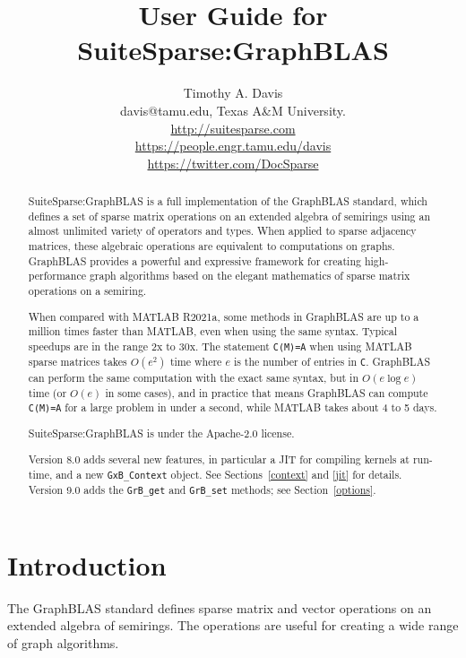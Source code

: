 \documentclass[12pt]{article}
\title{User Guide for SuiteSparse:GraphBLAS}
\author{Timothy A. Davis \\
\small
davis@tamu.edu, Texas A\&M University. \\
\small
\url{http://suitesparse.com} \\
\small
\url{https://people.engr.tamu.edu/davis} \\
\small
\url{https://twitter.com/DocSparse}
}
\begin{document}
\maketitle

\begin{abstract}
SuiteSparse:GraphBLAS is a full implementation of the GraphBLAS standard,
which defines a set of sparse matrix operations on an extended algebra of
semirings using an almost unlimited variety of operators and types.  When
applied to sparse adjacency matrices, these algebraic operations are equivalent
to computations on graphs.  GraphBLAS provides a powerful and expressive
framework for creating high-performance graph algorithms based on the elegant
mathematics of sparse matrix operations on a semiring.

When compared with MATLAB R2021a, some methods in GraphBLAS are up to
a million times faster than MATLAB, even when using the same syntax.
Typical speedups are in the range 2x to 30x.
The statement \verb'C(M)=A' when using MATLAB sparse matrices takes
$O(e^2)$ time where $e$ is the number of entries in \verb'C'.  GraphBLAS
can perform the same computation with the exact same syntax, but
in $O(e \log e)$ time (or $O(e)$ in some cases), and in practice that
means GraphBLAS can compute \verb'C(M)=A' for a large problem in under
a second, while MATLAB takes about 4 to 5 days.

SuiteSparse:GraphBLAS is under the Apache-2.0 license.

Version 8.0 adds several new features, in particular a JIT for compiling
kernels at run-time, and a new \verb'GxB_Context' object.
See Sections~\ref{context} and \ref{jit} for details.
Version 9.0 adds the \verb'GrB_get' and \verb'GrB_set' methods;
see Section~\ref{options}.

\end{abstract}

\newpage
{\small
\tableofcontents
}

\newpage
\section{Introduction} %
\label{intro}

The GraphBLAS standard defines sparse matrix and vector operations on an
extended algebra of semirings.  The operations are useful for creating a wide
range of graph algorithms.
\end{document}
